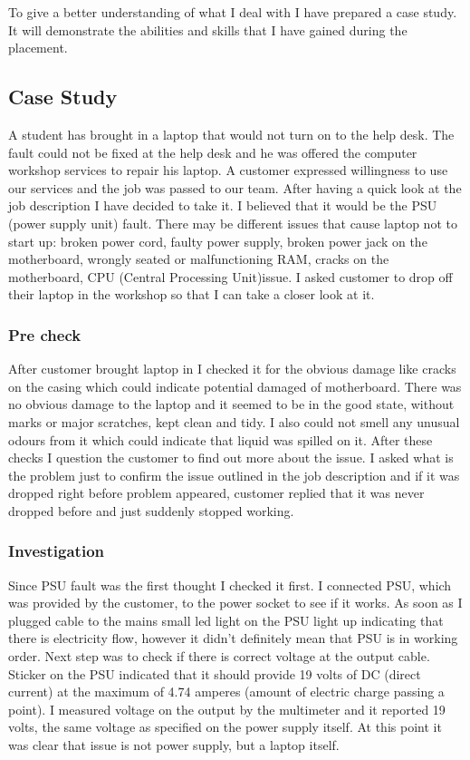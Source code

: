 \documentclass[10pt,a4paper,headinclude=true]{report}
\begin{document}
To give a better understanding of what I deal with I have prepared a case study. It will demonstrate the abilities and skills that I have gained during the placement. 

\subsection{Case Study}
A student has brought in a laptop that would not turn on to the help desk. The fault could not be fixed at the help desk and he was offered the computer workshop services to repair his laptop. A customer expressed willingness to use our services and the job was passed to our team. After having a quick look at the job description I have decided to take it. I believed that it would be the PSU (power supply unit) fault. There may be different issues that cause laptop not to start up: broken power cord, faulty power supply, broken power jack on the motherboard, wrongly seated or malfunctioning RAM, cracks on the motherboard, CPU (Central Processing Unit)issue. I asked customer to drop off their laptop in the workshop so that I can take a closer look at it. 
\subsubsection{Pre check}
After customer brought laptop in I checked it for the obvious damage like cracks on the casing which could indicate potential damaged of motherboard. There was no obvious damage to the laptop and it seemed to be in the good state, without marks or major scratches, kept clean and tidy. I also could not smell any unusual odours from it which could indicate that liquid was spilled on it. After these checks I question the customer to find out more about the issue. I asked what is the problem just to confirm the issue outlined in the job description and if it was dropped right before problem appeared, customer replied that it was never dropped before and just suddenly stopped working.
\subsubsection{Investigation}
Since PSU fault was the first thought I checked it first. I connected PSU, which was provided by the customer, to the power socket to see if it works. As soon as I plugged cable to the mains small led light on the PSU light up indicating that there is electricity flow, however it didn't definitely mean that PSU is in working order. Next step was to check if there is correct voltage at the output cable. Sticker on the PSU indicated that it should provide 19 volts of DC (direct current) at the maximum of 4.74 amperes (amount of electric charge passing a point). I measured voltage on the output by the multimeter and it reported 19 volts, the same voltage as specified on the power supply itself. At this point it was clear that issue is not power supply, but a laptop itself.  
\end{document}
